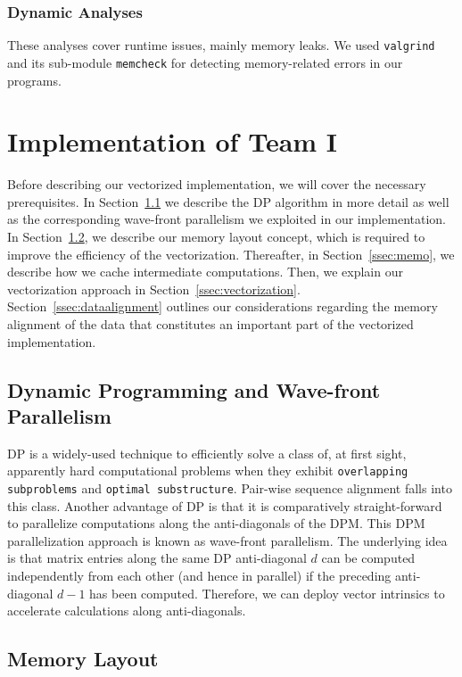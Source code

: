 \documentclass[runningheads,a4paper]{llncs}
\begin{document}
\subsubsection{Dynamic Analyses}
These analyses cover runtime issues, mainly memory leaks.
We used \texttt{valgrind} and its sub-module \texttt{memcheck} for detecting memory-related errors in our programs. 


\section{Implementation of Team I}
\label{sec:implementation-1}

Before describing our vectorized implementation, we will cover the necessary prerequisites.
In Section~\ref{ssec:dynprogramming} we describe the DP algorithm in more detail as well as the corresponding wave-front parallelism we exploited in our implementation. 
In Section~\ref{ssec:memorylayout}, we describe our memory layout concept, which is required to improve the efficiency of the vectorization. 
Thereafter, in Section~\ref{ssec:memo}, we describe how we cache intermediate computations. Then, we explain our vectorization approach in Section~\ref{ssec:vectorization}. 
Section~\ref{ssec:dataalignment} outlines our considerations regarding the memory alignment of the data that constitutes an important part of the vectorized implementation. 

\subsection{Dynamic Programming and Wave-front Parallelism}
\label{ssec:dynprogramming}

DP is a widely-used technique to efficiently solve a class of, at first sight, apparently hard computational problems when they exhibit
\texttt{overlapping subproblems} and \texttt{optimal substructure}. 
Pair-wise sequence alignment falls into this class. 
Another advantage of DP is that it is comparatively straight-forward to parallelize computations along the anti-diagonals 
of the DPM. 
This DPM parallelization approach is known as wave-front parallelism. 
The underlying idea is that matrix entries along the same DP anti-diagonal $d$ can be computed independently from each other (and hence in parallel) 
if the preceding anti-diagonal $d-1$ has been computed. 
Therefore, we can deploy vector intrinsics to accelerate calculations along anti-diagonals.


\subsection{Memory Layout}
\label{ssec:memorylayout}
\end{document}
